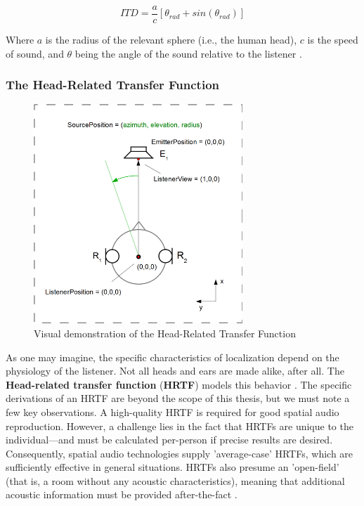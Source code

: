 \documentclass{report}
\newcommand{\tech}[1]{\textbf{#1}}
\begin{document}
$$
ITD = \frac{a}{c}[\theta_{rad} + sin(\theta_{rad})]
$$

Where $a$ is the radius of the relevant sphere (i.e., the human head), $c$ is the speed of sound, and $\theta$ being the angle of the sound relative to the listener \cite{woodworth1954experimental}.

\subsubsection{The Head-Related Transfer Function}



\begin{figure}
    \centering
    \includegraphics[width=0.7\textwidth]{hrtf.png}
    \caption{Visual demonstration of the Head-Related Transfer Function \cite{hrtfpic}}
    \label{fig:hrtf}
\end{figure}


As one may imagine, the specific characteristics of localization depend on the physiology of the listener. Not all heads and ears are made alike, after all. The \tech{Head-related transfer function} (\tech{HRTF}) models this behavior \cite{li2020measurement}. The specific derivations of an HRTF are beyond the scope of this thesis, but we must note a few key observations. A high-quality HRTF is required for good spatial audio reproduction. However, a challenge lies in the fact that HRTFs are unique to the individual---and must be calculated per-person if precise results are desired. Consequently, spatial audio technologies supply 'average-case' HRTFs, which are sufficiently effective in general situations. HRTFs also presume an 'open-field' (that is, a room without any acoustic characteristics), meaning that additional acoustic information must be provided after-the-fact \cite{moller1995head}. 
\end{document}
